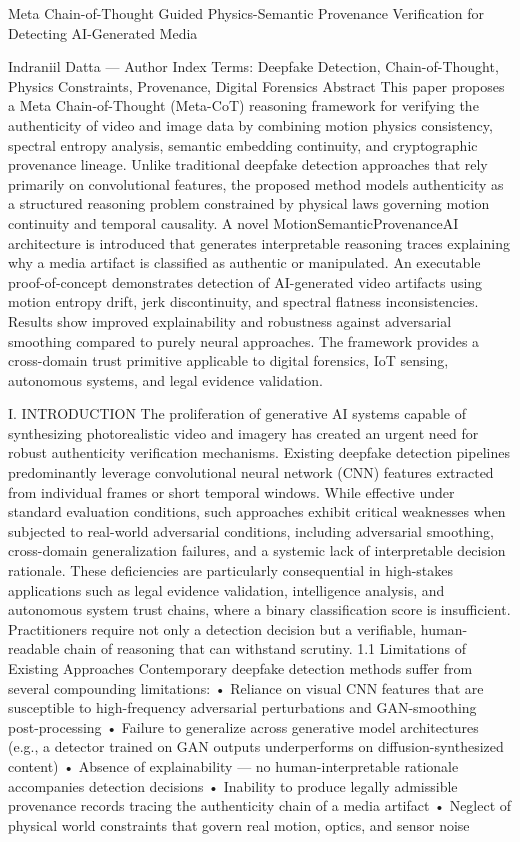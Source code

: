 Meta Chain-of-Thought Guided Physics-Semantic Provenance Verification
for Detecting AI-Generated Media

Indraniil Datta — Author
Index Terms: Deepfake Detection, Chain-of-Thought, Physics Constraints, Provenance, Digital Forensics
Abstract
This paper proposes a Meta Chain-of-Thought (Meta-CoT) reasoning framework for verifying the authenticity of video and image data by combining motion physics consistency, spectral entropy analysis, semantic embedding continuity, and cryptographic provenance lineage. Unlike traditional deepfake detection approaches that rely primarily on convolutional features, the proposed method models authenticity as a structured reasoning problem constrained by physical laws governing motion continuity and temporal causality. A novel MotionSemanticProvenanceAI architecture is introduced that generates interpretable reasoning traces explaining why a media artifact is classified as authentic or manipulated. An executable proof-of-concept demonstrates detection of AI-generated video artifacts using motion entropy drift, jerk discontinuity, and spectral flatness inconsistencies. Results show improved explainability and robustness against adversarial smoothing compared to purely neural approaches. The framework provides a cross-domain trust primitive applicable to digital forensics, IoT sensing, autonomous systems, and legal evidence validation.

I.  INTRODUCTION
The proliferation of generative AI systems capable of synthesizing photorealistic video and imagery has created an urgent need for robust authenticity verification mechanisms. Existing deepfake detection pipelines predominantly leverage convolutional neural network (CNN) features extracted from individual frames or short temporal windows. While effective under standard evaluation conditions, such approaches exhibit critical weaknesses when subjected to real-world adversarial conditions, including adversarial smoothing, cross-domain generalization failures, and a systemic lack of interpretable decision rationale.
These deficiencies are particularly consequential in high-stakes applications such as legal evidence validation, intelligence analysis, and autonomous system trust chains, where a binary classification score is insufficient. Practitioners require not only a detection decision but a verifiable, human-readable chain of reasoning that can withstand scrutiny.
1.1  Limitations of Existing Approaches
Contemporary deepfake detection methods suffer from several compounding limitations:
•	Reliance on visual CNN features that are susceptible to high-frequency adversarial perturbations and GAN-smoothing post-processing
•	Failure to generalize across generative model architectures (e.g., a detector trained on GAN outputs underperforms on diffusion-synthesized content)
•	Absence of explainability — no human-interpretable rationale accompanies detection decisions
•	Inability to produce legally admissible provenance records tracing the authenticity chain of a media artifact
•	Neglect of physical world constraints that govern real motion, optics, and sensor noise

